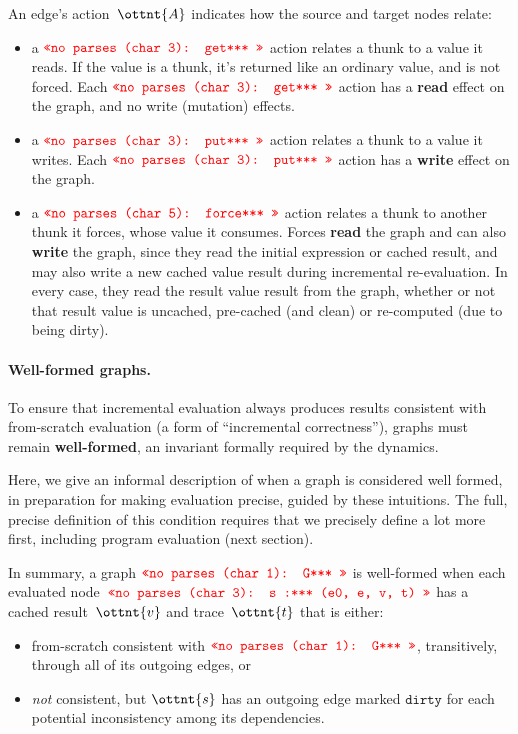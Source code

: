 \documentclass[11pt]{article}
\renewcommand{\ottkw}[1]{\mathtt{#1}}
\begin{document}
An edge's action~$\ottnt{A}$ indicates how the source and target nodes relate:
\begin{itemize}

\item a $\texttt{\textcolor{red}{<<no parses (char 3): get*** >>}}$ action relates a thunk to a value it reads.  If the value is
  a thunk, it's returned like an ordinary value, and is not
  forced. Each $\texttt{\textcolor{red}{<<no parses (char 3): get*** >>}}$ action has a \textbf{read} effect on the
  graph, and no write (mutation) effects.

\item a $\texttt{\textcolor{red}{<<no parses (char 3): put*** >>}}$ action relates a thunk to a value it writes.
  Each $\texttt{\textcolor{red}{<<no parses (char 3): put*** >>}}$ action has a \textbf{write} effect on the graph.

\item a $\texttt{\textcolor{red}{<<no parses (char 5): force*** >>}}$ action relates a thunk to another thunk it forces,
  whose value it consumes.  Forces \textbf{read} the graph and can
  also \textbf{write} the graph, since they read the initial
  expression or cached result, and may also write a new cached value
  result during incremental re-evaluation.
  In every case, they read the result value result from the graph,
  whether or not that result value is uncached, pre-cached (and clean)
  or re-computed (due to being dirty).

\end{itemize}


\paragraph{Well-formed graphs.}
To ensure that incremental evaluation always produces results
consistent with from-scratch evaluation (a form of ``incremental
correctness''), graphs must remain \textbf{well-formed}, an invariant
formally required by the dynamics.

Here, we give an informal description of when a graph is considered
well formed, in preparation for making evaluation precise, guided by
these intuitions.
%
The full, precise definition of this condition requires that we
precisely define a lot more first, including program evaluation (next
section).

In summary, a graph $\texttt{\textcolor{red}{<<no parses (char 1): G*** >>}}$ is well-formed when each evaluated node~$\texttt{\textcolor{red}{<<no parses (char 3): s :*** (e0, e, v, t) >>}}$ has a cached result~$\ottnt{v}$ and trace~$\ottnt{t}$ that is either:
\begin{itemize}
\item from-scratch consistent with $\texttt{\textcolor{red}{<<no parses (char 1): G*** >>}}$, transitively, through all of its outgoing edges, or
\item \emph{not} consistent, but $\ottnt{s}$ has an outgoing edge marked $\ottkw{dirty}$ for each potential inconsistency among its dependencies.
\end{itemize}
\end{document}
